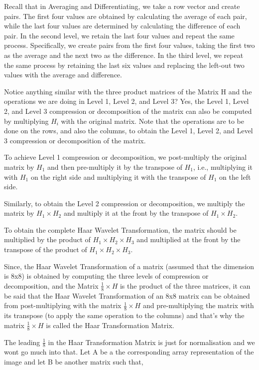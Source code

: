\documentclass{article}
\begin{document}
\setlength{\parindent}{1cm}
Recall that in Averaging and Differentiating, we take a row vector and create pairs. The first four values are obtained by calculating the average of each pair, while the last four values are determined by calculating the difference of each pair. In the second level, we retain the last four values and repeat the same process. Specifically, we create pairs from the first four values, taking the first two as the average and the next two as the difference. In the third level, we repeat the same process by retaining the last six values and replacing the left-out two values with the average and difference.

\setlength{\parindent}{1cm}
Notice anything similar with the three product matrices of the Matrix H and the operations we are doing in Level 1, Level 2, and Level 3? Yes, the Level 1, Level 2, and Level 3 compression or decomposition of the matrix can also be computed by multiplying $H_i$ with the original matrix. Note that the operations are to be done on the rows, and also the columns, to obtain the Level 1, Level 2, and Level 3 compression or decomposition of the matrix.

To achieve Level 1 compression or decomposition, we post-multiply the original matrix by $H_1$ and then pre-multiply it by the transpose of $H_1$, i.e., multiplying it with $H_1$ on the right side and multiplying it with the transpose of $H_1$ on the left side.

Similarly, to obtain the Level 2 compression or decomposition, we multiply the matrix by $H_1 \times H_2$ and multiply it at the front by the transpose of $H_1 \times H_2$.

To obtain the complete Haar Wavelet Transformation, the matrix should be multiplied by the product of $H_1 \times H_2 \times H_3$ and multiplied at the front by the transpose of the product of $H_1 \times H_2 \times H_3$.

Since, the Haar Wavelet Transformation of a matrix (assumed that the dimension is 8x8) is obtained by computing the three levels of compression or decomposition, and the Matrix $\frac{1}{8}\times H$ is the product of the three matrices, it can be said that the Haar Wavelet Transformation of an 8x8 matrix can be obtained from post-multiplying with the matrix $\frac{1}{8}\times H$ and pre-multiplying the matrix with its transpose (to apply the same operation to the columns) and that's why the matrix $\frac{1}{8}\times H$ is called the Haar Transformation Matrix. 

The leading $\frac{1}{8}$ in the Haar Transformation Matrix is just for normalisation and we wont go much into that. Let A be a the corresponding array representation of the image and let B be another matrix such that, 
\end{document}
